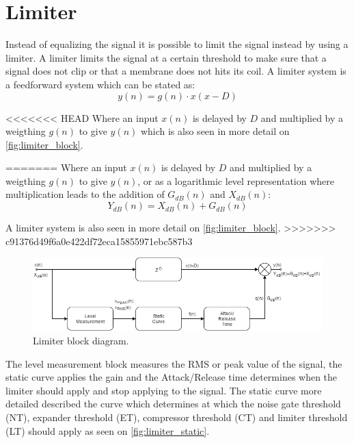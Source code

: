 \section{Limiter}
Instead of equalizing the signal it is possible to limit the signal instead by using a limiter. A limiter limits the signal at a certain threshold to make sure that a signal does not clip or that a membrane does not hits its coil. A limiter system is a feedforward system which can be stated as:
\begin{equation}
y(n) = g(n)\cdot x(x-D)
\end{equation}

<<<<<<< HEAD
Where an input $x(n)$ is delayed by $D$ and multiplied by a weigthing $g(n)$ to give $y(n)$ which is also seen in more detail on \autoref{fig:limiter_block}.
  
=======
Where an input $x(n)$ is delayed by $D$ and multiplied by a weigthing $g(n)$ to give $y(n)$, or as a logarithmic level representation where multiplication leads to the addition of $G_{dB}(n)$ and $X_{dB}(n)$:
\begin{equation}
Y_{dB}(n) = X_{dB}(n) + G_{dB}(n)
\end{equation}

A limiter system is also seen in more detail on \autoref{fig:limiter_block}.
>>>>>>> c91376d49f6a0e422df72eca15855971ebc587b3

\begin{figure}[H]
\centering
\includegraphics[width=1\textwidth]{figures/Limiter_block.png}
\caption{Limiter block diagram.}
\label{fig:limiter_block}
\end{figure}   


The level measurement block measures the RMS or peak value of the signal, the static curve applies the gain and the Attack/Release time determines when the limiter should apply and stop applying to the signal. The static curve more detailed described the curve which determines at which the noise gate threshold (NT), expander threshold (ET), compressor threshold (CT) and limiter threshold (LT) should apply as seen on \autoref{fig:limiter_static}. 


